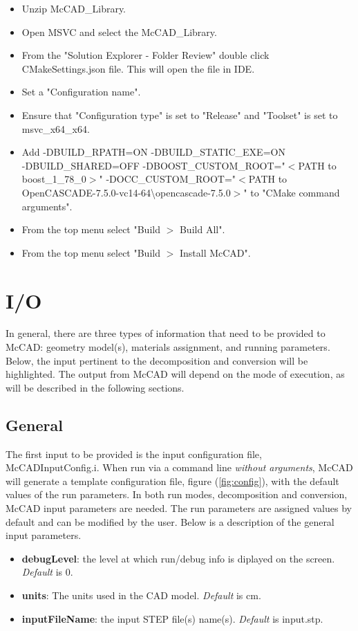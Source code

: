 \documentclass[12pt, a4paper, titlepage]{article}
\begin{document}
\begin{itemize}
\begin{itemize}
		\item Unzip McCAD\_Library.
		\item Open MSVC and select the McCAD\_Library.
		\item From the "Solution Explorer - Folder Review" double click CMakeSettings.json file. This will open the file in IDE. \item Set a "Configuration name". 
		\item Ensure that "Configuration type" is set to "Release" and "Toolset" is set to msvc\_x64\_x64.
		\item Add -DBUILD\_RPATH=ON -DBUILD\_STATIC\_EXE=ON \\ -DBUILD\_SHARED=OFF -DBOOST\_CUSTOM\_ROOT="$<$PATH to boost\_1\_78\_0$>$" -DOCC\_CUSTOM\_ROOT="$<$PATH to OpenCASCADE-7.5.0-vc14-64\textbackslash opencascade-7.5.0$>$" to "CMake command arguments".
		\item From the top menu select "Build $>$ Build All".
		\item From the top menu select "Build $>$ Install McCAD".
	  \end{itemize}
    \end{itemize}

\section{I/O} \label{sec:I/O}
In general, there are three types of information that need to be provided to McCAD: geometry model(s), materials assignment, and running parameters. Below, the input pertinent to the decomposition and conversion will be highlighted. The output from McCAD will depend on the mode of execution, as will be described in the following sections.
  \subsection{General}
	The first input to be provided is the input configuration file, McCADInputConfig.i.  When run via a command line \emph{without arguments}, McCAD will generate a template configuration file, figure (\ref{fig:config}), with the default values of the run parameters. In both run modes, decomposition and conversion, McCAD input parameters are needed. The run parameters are assigned values by default and can be modified by the user. Below is a description of the general input parameters.
	\begin{itemize}
		\item \textbf{debugLevel}: the level at which run/debug info is diplayed on the screen. \emph{Default} is 0.
		\item \textbf{units}: The units used in the CAD model. \emph{Default} is cm.
		\item \textbf{inputFileName}: the input STEP file(s) name(s). \emph{Default} is input.stp.
	\end{itemize}
\end{document}
